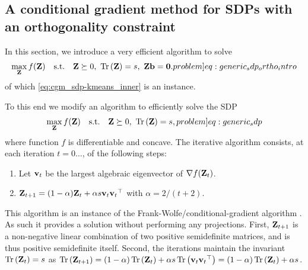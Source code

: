 \documentclass[twoside,11pt]{article}
\begin{document}
\subsection{A conditional gradient method for SDPs with an orthogonality constraint}

In this section, we introduce a very efficient algorithm to solve
\begin{equation}
	\max_{\mat{Z}}
    f(\mat{Z})
    \quad\text{s.t.}\quad
    \mat{Z} \succeq 0 ,\
    \traceone{\mat{Z}} = s ,\
    \mat{Z} \vect{b} = \vect{0} .
    \label[problem]{eq:generic_sdp_ortho_intro}
\end{equation}
of which \cref{eq:cgm_sdp-kmeans_inner} is an instance.

To this end we modify an algorithm to efficiently solve the SDP \citep{Hazan2008sdp}
\begin{equation}
	\max_{\mat{Z}}
    f(\mat{Z})
    \quad\text{s.t.}\quad
    \mat{Z} \succeq 0 ,\ \traceone{\mat{Z}} = s ,
    \label[problem]{eq:generic_sdp}
\end{equation}
where function $f$ is differentiable and concave.
The iterative algorithm consists, at each iteration $t = 0 \dots$, of the following steps:
\begin{enumerate}
    \item Let ${\mathbf{v}}_{t}$ be the largest algebraic eigenvector of $\nabla f({\mathbf{Z}}_t)$.
    \item ${\mathbf{Z}}_{t+1} = (1 - \alpha) {\mathbf{Z}}_{t} + \alpha s {\mathbf{v}}_{t} {{\mathbf{v}}_{t}}^\top$ with $\alpha = 2 / (t + 2)$.
\end{enumerate}
This algorithm is an instance of the Frank-Wolfe/conditional-gradient algorithm \citep{FrankWolfe}. As such it provides a solution without performing any projections. First, ${\mathbf{Z}}_{t+1}$ is a non-negative linear combination of two positive semidefinite matrices, and is thus positive semidefinite itself. Second, the iterations maintain the invariant $\operatorname{Tr}\left({\mathbf{Z}}_{t}\right) = s$ as $\operatorname{Tr}\left({\mathbf{Z}}_{t+1}\right) = (1 - \alpha) \operatorname{Tr}\left({\mathbf{Z}}_{t}\right) + \alpha s \operatorname{Tr}\left({\mathbf{v}}_{t} {{\mathbf{v}}_{t}}^\top\right) = (1 - \alpha) \operatorname{Tr}\left({\mathbf{Z}}_{t}\right) + \alpha s$.
\end{document}
